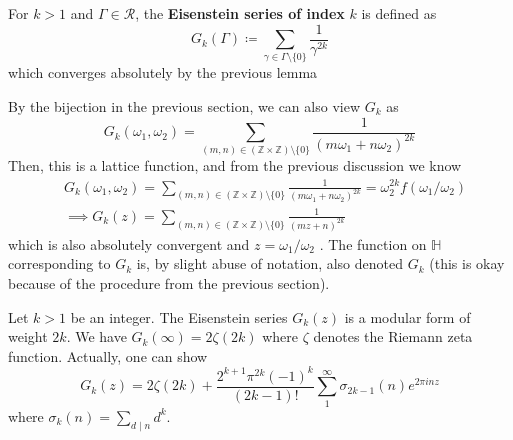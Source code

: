 \documentclass[12pt]{article}
\theoremstyle{definition}
\begin{document}
\begin{dfn}
For \(k>1\) and \(\Gamma \in \mathscr{R} \), the \textbf{Eisenstein series of index} \(k\) is defined as
\[
    G_k(\Gamma )\coloneqq \sum_{\gamma \in \Gamma\setminus \{ 0 \}  } \frac{1}{\gamma ^{2k}} 
\]    
which converges absolutely by the previous lemma
\end{dfn}
By the bijection in the previous section, we can also view \(G_k\) as
\[
    G_k(\omega _1,\omega _2) = \sum_{(m,n)\in (\mathbb{Z} \times \mathbb{Z}) \setminus \{ 0 \}  }\frac{1}{(m \omega _1+ n \omega _2)^{2k}}
\] 
Then, this is a lattice function, and from the previous discussion we know
\begin{align*}
    &G_k(\omega _1,\omega _2) = \sum_{(m,n)\in (\mathbb{Z} \times \mathbb{Z}) \setminus \{ 0 \}  }\frac{1}{(m \omega _1+ n \omega _2)^{2k}} = \omega _2^{2k} f(\omega_1/\omega_2)\\  &\implies G_k(z) = \sum_{(m,n)\in (\mathbb{Z} \times \mathbb{Z}) \setminus \{ 0 \}  }\frac{1}{(m z+n)^{2k}}
\end{align*}
which is also absolutely convergent and \(z=\omega_1/\omega _2\) . The function on \(\mathbb{H}\) corresponding to \(G_k\) is, by slight abuse of notation, also denoted \(G_k\) (this is okay because of the procedure from the previous section). 
\begin{prop}[label=eisen]
Let \(k>1\) be an integer. The Eisenstein series \(G_k(z)\) is a modular form of weight \(2k\). We have \(G_k(\infty ) = 2\zeta (2k)\) where \(\zeta \) denotes the Riemann zeta function. Actually, one can show
\[
    G_k(z) = 2 \zeta (2k) + \frac{2^{k+1}\pi ^{2k}(-1)^k}{(2k-1)!} \sum_1^{\infty} \sigma_{2k-1}(n)e^{2\pi inz}
\]
where \(\sigma_k(n) = \sum_{d \mid n} d^k\). 
\end{prop}
\end{document}
